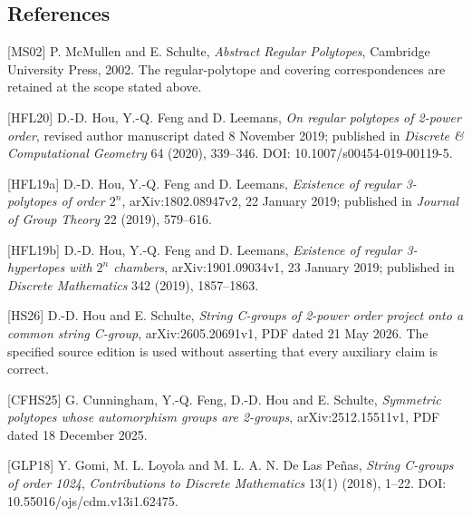 \documentclass[
  11pt,
  a4paper,
]{article}
\begin{document}
\subsection{References}\label{references}

{[}MS02{]} P. McMullen and E. Schulte, \emph{Abstract Regular
Polytopes}, Cambridge University Press, 2002. The regular-polytope and
covering correspondences are retained at the scope stated above.

{[}HFL20{]} D.-D. Hou, Y.-Q. Feng and D. Leemans, \emph{On regular
polytopes of 2-power order}, revised author manuscript dated 8 November
2019; published in \emph{Discrete \& Computational Geometry} 64 (2020),
339--346. DOI: 10.1007/s00454-019-00119-5.

{[}HFL19a{]} D.-D. Hou, Y.-Q. Feng and D. Leemans, \emph{Existence of
regular 3-polytopes of order \(2^n\)}, arXiv:1802.08947v2, 22 January
2019; published in \emph{Journal of Group Theory} 22 (2019), 579--616.

{[}HFL19b{]} D.-D. Hou, Y.-Q. Feng and D. Leemans, \emph{Existence of
regular 3-hypertopes with \(2^n\) chambers}, arXiv:1901.09034v1, 23
January 2019; published in \emph{Discrete Mathematics} 342 (2019),
1857--1863.

{[}HS26{]} D.-D. Hou and E. Schulte, \emph{String C-groups of 2-power
order project onto a common string C-group}, arXiv:2605.20691v1, PDF
dated 21 May 2026. The specified source edition is used without
asserting that every auxiliary claim is correct.

{[}CFHS25{]} G. Cunningham, Y.-Q. Feng, D.-D. Hou and E. Schulte,
\emph{Symmetric polytopes whose automorphism groups are 2-groups},
arXiv:2512.15511v1, PDF dated 18 December 2025.

{[}GLP18{]} Y. Gomi, M. L. Loyola and M. L. A. N. De Las Peñas,
\emph{String C-groups of order 1024}, \emph{Contributions to Discrete
Mathematics} 13(1) (2018), 1--22. DOI: 10.55016/ojs/cdm.v13i1.62475.
\end{document}
